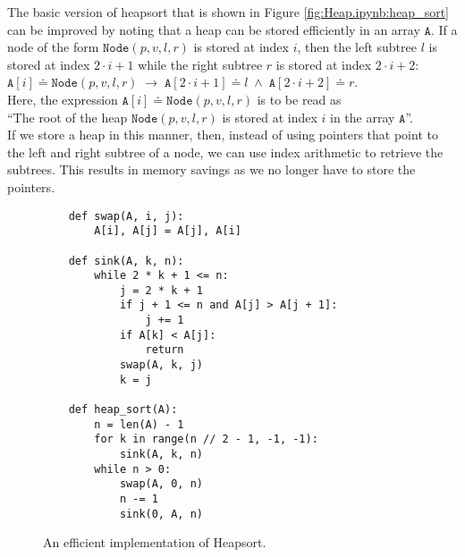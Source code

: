 The basic version of heapsort that is shown in Figure \ref{fig:Heap.ipynb:heap_sort} can be improved
by noting that a heap can be stored efficiently in an array $\texttt{A}$.  If a node of the form
$\texttt{Node}(p, v, l, r)$ is stored at index $i$, then the left subtree $l$ is stored at
index $2 \cdot i + 1$ while the right subtree $r$ is stored at index $2 \cdot i + 2$:
\\[0.2cm]
\hspace*{1.3cm}
$\texttt{A}[i] \doteq \texttt{Node}(p, v, l, r) \;\rightarrow\; \texttt{A}[2\cdot i + 1] \doteq l \;\wedge\; \texttt{A}[2\cdot i+2] \doteq r$.
\\[0.2cm]
Here, the expression $\texttt{A}[i] \doteq \texttt{Node}(p, v, l, r)$ is to be read as 
\\[0.2cm]
\hspace*{1.3cm}
``The root of the heap $\texttt{Node}(p, v, l, r)$ is stored at index $i$ in the array $\texttt{A}$''.
\\[0.2cm]
If we store a heap in this manner, then, instead of using pointers that point to the left and right
subtree of a node, we can use index arithmetic to retrieve the subtrees.  This results in memory savings as we
no longer have to store the pointers.


\begin{figure}[!ht]
\centering
\begin{verbatim}
    def swap(A, i, j):
        A[i], A[j] = A[j], A[i]
    
    def sink(A, k, n):
        while 2 * k + 1 <= n:
            j = 2 * k + 1
            if j + 1 <= n and A[j] > A[j + 1]:
                j += 1
            if A[k] < A[j]:
                return
            swap(A, k, j)
            k = j
    
    def heap_sort(A):
        n = len(A) - 1
        for k in range(n // 2 - 1, -1, -1):
            sink(A, k, n)
        while n > 0:
            swap(A, 0, n)
            n -= 1
            sink(0, A, n)
\end{verbatim}
\vspace*{-0.3cm}
\caption{An efficient implementation of Heapsort.}
\label{fig:Heapsort.ipynb}
\end{figure}



